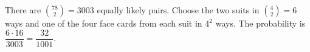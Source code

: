 There are $\binom{78}{2}=3003$ equally likely pairs. Choose the two suits in $\binom 42=6$ ways and one of the four face cards from each suit in $4^2$ ways. The probability is $\dfrac{6\cdot 16}{3003}=\boxed{\dfrac{32}{1001}}$.
